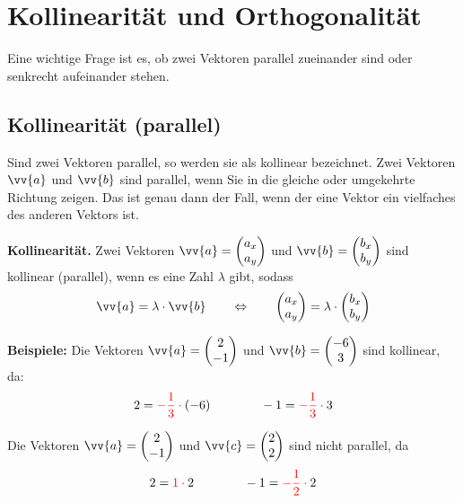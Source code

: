 \newpage
\section{Kollinearität und Orthogonalität}

Eine wichtige Frage ist es, ob zwei Vektoren parallel zueinander sind oder senkrecht aufeinander stehen.

\subsection{Kollinearität (parallel)}

Sind zwei Vektoren parallel, so werden sie als kollinear bezeichnet. Zwei Vektoren $\vv{a}$ und $\vv{b}$ sind parallel, wenn Sie in die gleiche oder umgekehrte Richtung zeigen. Das ist genau dann der Fall, wenn der eine Vektor ein vielfaches des anderen Vektors ist.

\begin{theorem}
  \textbf{Kollinearität.} Zwei Vektoren $\vv{a} = \vxy{a_{x}}{a_{y}}$ und $\vv{b} = \vxy{b_{x}}{b_{y}}$ sind kollinear (parallel), wenn es eine Zahl $\lambda$ gibt, sodass
  \[
    \vv{a} = \lambda\cdot\vv{b} \qquad\Leftrightarrow\qquad \vxy{a_{x}}{a_{y}} = \lambda\cdot\vxy{b_{x}}{b_{y}}
  \]
\end{theorem}

\begin{center}
\end{center}

\begin{example}
  \textbf{Beispiele:} Die Vektoren $\vv{a} = \vxy{2}{-1}$ und $\vv{b} = \vxy{-6}{3}$ sind kollinear, da:
  \[
     2 = \mathcolor{red}{-\frac{1}{3}\cdot} (-6) \qquad\qquad -1 = \mathcolor{red}{-\frac{1}{3}\cdot} 3
  \]

  Die Vektoren $\vv{a} = \vxy{2}{-1}$ und $\vv{c} = \vxy{2}{2}$ sind nicht parallel, da
  \[
    2 = \mathcolor{red}{1\cdot} 2 \qquad\qquad -1 = \mathcolor{red}{-\frac{1}{2}\cdot} 2
  \]
\end{example}

